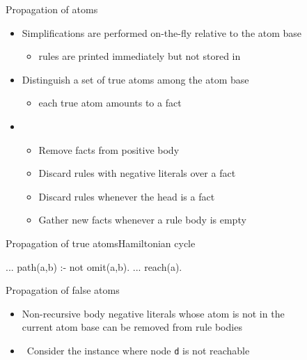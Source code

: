 \begin{frame}{Propagation of atoms}
  \bigskip
  \begin{itemize}
  \item Simplifications are performed \alert{on-the-fly} relative to the atom base
    \begin{itemize}\normalsize
    \item [\itarrow] rules are printed immediately but not stored in \gringo
    \end{itemize}
    \medskip
  \item<2-> Distinguish a set of \alert{true atoms} among the atom base
    \begin{itemize}\normalsize
    \item [\itarrow] each true atom amounts to a fact
    \end{itemize}
    \medskip
  \item<3-> 
    \begin{itemize}\normalsize
    \item Remove facts from positive body
      \smallskip
    \item Discard rules with negative literals over a fact
      \smallskip
    \item Discard rules whenever the head is a fact
      \smallskip
    \item Gather new facts whenever a rule body is empty
    \end{itemize}
  \end{itemize}
\end{frame}
\begin{frame}[fragile]{Propagation of true atoms}{Hamiltonian cycle}
  \bigskip
  \begin{SemiVerbatim}{.9}
...
path(a,b) :- not omit(a,b).
...
reach(a). {}
\end{SemiVerbatim}
\end{frame}
\begin{frame}{Propagation of false atoms}
  \bigskip
  \begin{itemize}
  \item<2-> \alert{Non-recursive body negative literals} whose atom is not in the
    \\ current atom base can be removed from rule bodies
    \medskip
  \item<3->  \ Consider the instance where node \texttt{d} is not reachable
  \bigskip
  \begin{center}
    \Graph[draw=none]
  \end{center}
  \end{itemize}
\end{frame}
